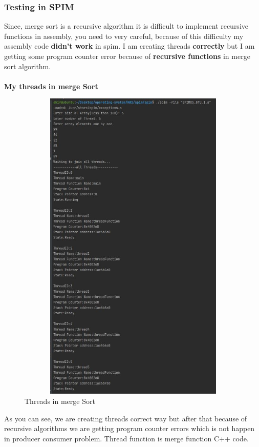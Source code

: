 \documentclass{article}
\begin{document}
\subsubsection{Testing in SPIM}
Since, merge sort is a recursive algorithm it is difficult to implement recursive functions in assembly, you need to very careful,
because of this difficulty my assembly code \textbf{didn't work} in spim. I am creating threads \textbf{correctly} but I am getting some
program counter error because of \textbf{recursive functions} in merge sort algorithm. \\ \\
\textbf{My threads in merge Sort} 
\begin{figure}[H]
    \centering
	\includegraphics[width=5in, height=6in]{34.JPG}
	\caption[Optional caption]{Threads in merge Sort}
	\label{}
\end{figure}
\hfill \break
As you can see, we are creating threads correct way but after that because of recursive algorithms we are getting program counter errors which is
not happen in producer consumer problem. Thread function is merge function C++ code.
\end{document}
